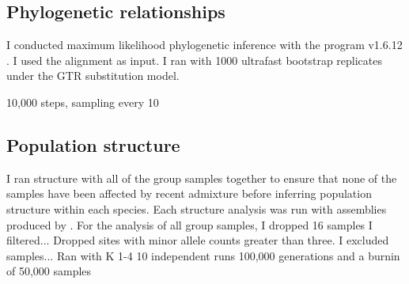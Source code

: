 



\subsection{Phylogenetic relationships}
I conducted maximum likelihood phylogenetic inference with the program \iqtree
v1.6.12 \parencite{nguyen2015}.
I used the \pyrad alignment as input.
I ran \iqtree with 1000 ultrafast bootstrap replicates \parencite{hoang2018}
under the GTR substitution model.

\phycoevol

10,000 steps, sampling every 10




\subsection{Population structure}





I ran structure with all of the \amer group samples together to ensure that 
none of the samples have been affected by recent admixture before inferring
population structure within each species.
Each structure analysis was run with assemblies produced by \stacks.
For the analysis of all \amer group samples,
I dropped 16 samples 
I filtered...
Dropped sites with minor allele counts greater than three.
I excluded samples...
Ran with K 1-4
10 independent runs
100,000 generations and a burnin of 50,000 samples

















